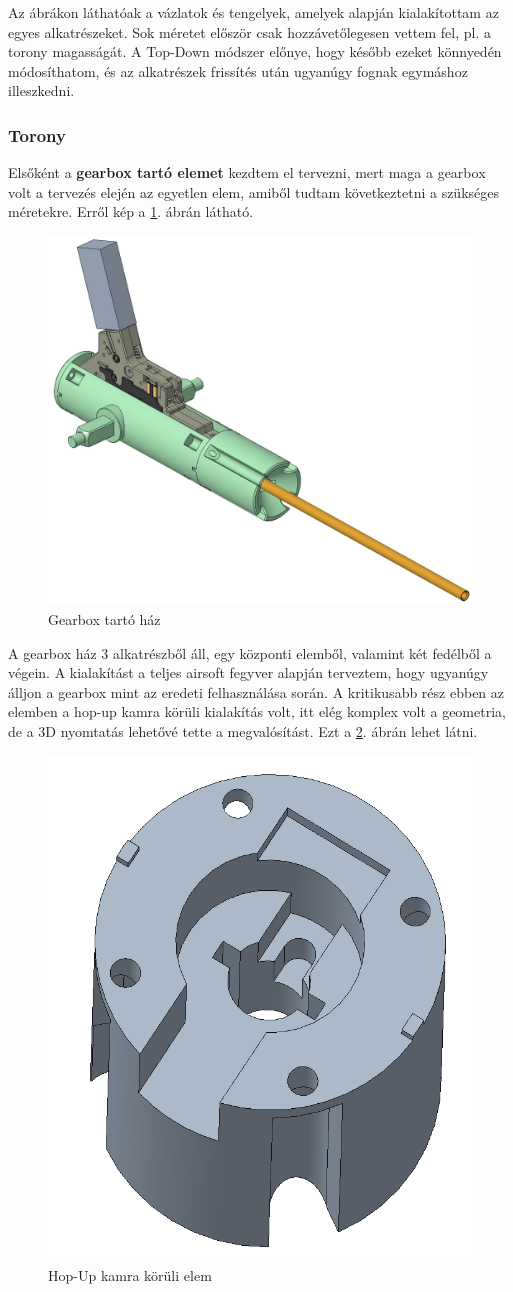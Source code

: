 \documentclass[12pt,a4paper]{article}
\begin{document}
Az ábrákon láthatóak a vázlatok és tengelyek, amelyek alapján kialakítottam az egyes alkatrészeket. Sok méretet először csak hozzávetőlegesen vettem fel, pl. a torony magasságát. A Top-Down módszer előnye, hogy később ezeket könnyedén módosíthatom, és az alkatrészek frissítés után ugyanúgy fognak egymáshoz illeszkedni.


\subsubsection{Torony}

Elsőként a \textbf{gearbox tartó elemet} kezdtem el tervezni, mert maga a gearbox volt a tervezés elején az egyetlen elem, amiből tudtam következtetni a szükséges méretekre. Erről kép a \ref{fig:mech_dt4000}. ábrán látható. 

\begin{figure}[h!]
	\centering
	\includegraphics[width=0.8\linewidth]{mech_dt4000}
	\caption{Gearbox tartó ház}
	\label{fig:mech_dt4000}
\end{figure}

A gearbox ház 3 alkatrészből áll, egy központi elemből, valamint két fedélből a végein. A kialakítást a teljes airsoft fegyver alapján terveztem, hogy ugyanúgy álljon a gearbox mint az eredeti felhasználása során. A kritikusabb rész ebben az elemben a hop-up kamra körüli kialakítás volt, itt elég komplex volt a geometria, de a 3D nyomtatás lehetővé tette a megvalósítást. Ezt a \ref{fig:mech_dt4200}. ábrán lehet látni.


\begin{figure}[h!]
	\centering
	\includegraphics[width=0.4\linewidth]{mech_dt4200}
	\caption{Hop-Up kamra körüli elem}
	\label{fig:mech_dt4200}
\end{figure}
\end{document}
